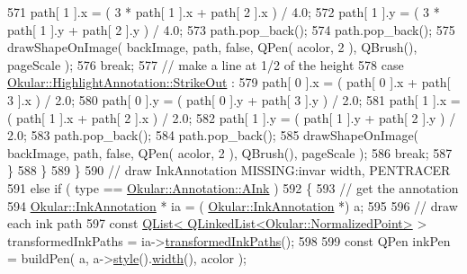 \begin{DoxyCode}
571                                 path[ 1 ].x = ( 3 * path[ 1 ].x + path[ 2 ].x ) / 4.0;
572                                 path[ 1 ].y = ( 3 * path[ 1 ].y + path[ 2 ].y ) / 4.0;
573                                 path.pop\_back();
574                                 path.pop\_back();
575                                 drawShapeOnImage( backImage, path, \textcolor{keyword}{false}, QPen( acolor, 2 ), QBrush(), 
      pageScale );
576                                 \textcolor{keywordflow}{break};
577                             \textcolor{comment}{// make a line at 1/2 of the height}
578                             \textcolor{keywordflow}{case} \hyperlink{classOkular_1_1HighlightAnnotation_a63d2488735d1d6320e2e118743243999afcdb9513e4039b7239d89f351f8aff85}{Okular::HighlightAnnotation::StrikeOut}
      :
579                                 path[ 0 ].x = ( path[ 0 ].x + path[ 3 ].x ) / 2.0;
580                                 path[ 0 ].y = ( path[ 0 ].y + path[ 3 ].y ) / 2.0;
581                                 path[ 1 ].x = ( path[ 1 ].x + path[ 2 ].x ) / 2.0;
582                                 path[ 1 ].y = ( path[ 1 ].y + path[ 2 ].y ) / 2.0;
583                                 path.pop\_back();
584                                 path.pop\_back();
585                                 drawShapeOnImage( backImage, path, \textcolor{keyword}{false}, QPen( acolor, 2 ), QBrush(), 
      pageScale );
586                                 \textcolor{keywordflow}{break};
587                         \}
588                     \}
589                 \}
590                 \textcolor{comment}{// draw InkAnnotation MISSING:invar width, PENTRACER}
591                 \textcolor{keywordflow}{else} \textcolor{keywordflow}{if} ( type == \hyperlink{classOkular_1_1Annotation_af71b46e37d5f850b97d5c4de3be9aac0a4ed60063584ceb146c2a378f0df4ed37}{Okular::Annotation::AInk} )
592                 \{
593                     \textcolor{comment}{// get the annotation}
594                     \hyperlink{classOkular_1_1InkAnnotation}{Okular::InkAnnotation} * ia = (
      \hyperlink{classOkular_1_1InkAnnotation}{Okular::InkAnnotation} *) a;
595 
596                     \textcolor{comment}{// draw each ink path}
597                     \textcolor{keyword}{const} \hyperlink{classQList}{QList< QLinkedList<Okular::NormalizedPoint>}
       > transformedInkPaths = ia->\hyperlink{classOkular_1_1InkAnnotation_aaefc02004360e97d31919ea1516ab736}{transformedInkPaths}();
598 
599                     \textcolor{keyword}{const} QPen inkPen = buildPen( a, a->\hyperlink{classOkular_1_1Annotation_ae1f845ddbd6d524b2b388c6c9ef26423}{style}().\hyperlink{classOkular_1_1Annotation_1_1Style_a5a8e23f3a4f95e25f45770937dc82948}{width}(), acolor );

\end{DoxyCode}
